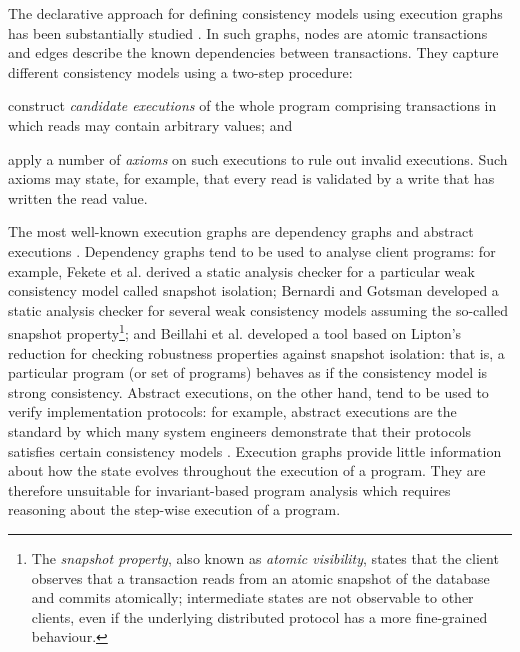 The declarative approach for defining 
consistency models using execution graphs has been substantially
studied \cite{adya,ev_transactions,framework-concur,SIanalysis,laws}. 
In such graphs,  nodes are atomic transactions and edges describe the
known dependencies between transactions.
They capture different consistency models using  a two-step procedure:
\begin{enumerate*}
\item construct \emph{candidate executions} of the whole program comprising
transactions in which reads may contain arbitrary values; and 
\item apply a number of \emph{axioms} on such executions to rule out invalid executions. 
Such axioms may state, for example, that every read is
validated by a write that has written the read value. 
\end{enumerate*}
The most well-known execution graphs are dependency graphs \cite{adya} and abstract
executions \cite{ev_transactions,framework-concur}. 
Dependency graphs tend to be used to analyse  client programs: for
example, 
Fekete et al. \citet{fekete-tods} derived 
a static analysis checker for a particular weak consistency model called
snapshot isolation;  Bernardi and Gotsman \citet{giovanni_concur16}
developed a static analysis checker for several weak consistency
models assuming the so-called snapshot property\footnote{The \emph{snapshot property}, 
also known as \emph{atomic visibility}, states that
the client observes that a transaction reads from an atomic snapshot
of the database and commits atomically;  intermediate states are not observable to other clients, 
even if the underlying distributed protocol has a more fine-grained behaviour.}; and 
Beillahi et al. \citep{snapshot-isolation-robust-tool} developed a tool based on Lipton's reduction \cite{Lipton-reduction}
for checking robustness properties against snapshot isolation: 
that is, a  particular program (or set of programs) behaves as if the consistency model is strong consistency. 
Abstract executions, on the other hand, tend to be used to verify  implementation protocols: for example,
abstract executions are the  standard by which many system engineers
demonstrate that their protocols satisfies  certain
consistency models \cite{cops,NMSI,PSI}. 
Execution graphs provide little information about how the 
state evolves throughout the execution of a program.
They are therefore unsuitable for invariant-based program analysis 
which requires reasoning about the step-wise execution of a program. 


